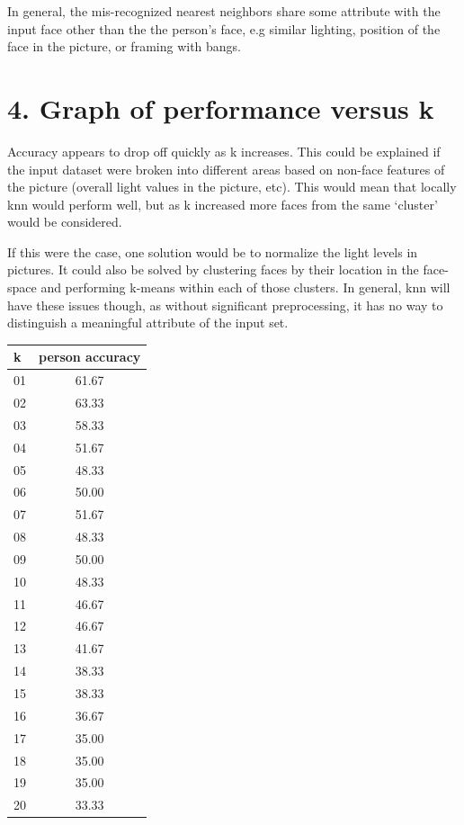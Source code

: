 \documentclass[]{article}
\begin{document}
In general, the mis-recognized nearest neighbors share some attribute
with the input face other than the the person's face, e.g similar
lighting, position of the face in the picture, or framing with bangs.

\section{4. Graph of performance versus
k}\label{graph-of-performance-versus-k}

Accuracy appears to drop off quickly as k increases. This could be
explained if the input dataset were broken into different areas based on
non-face features of the picture (overall light values in the picture,
etc). This would mean that locally knn would perform well, but as k
increased more faces from the same `cluster' would be considered.

\begin{center}
\end{center}

If this were the case, one solution would be to normalize the light
levels in pictures. It could also be solved by clustering faces by their
location in the face-space and performing k-means within each of those
clusters. In general, knn will have these issues though, as without
significant preprocessing, it has no way to distinguish a meaningful
attribute of the input set.

\begin{longtable}[c]{@{}lc@{}}
\toprule
k & person accuracy\tabularnewline
\midrule
\endhead
01 & 61.67\tabularnewline
02 & 63.33\tabularnewline
03 & 58.33\tabularnewline
04 & 51.67\tabularnewline
05 & 48.33\tabularnewline
06 & 50.00\tabularnewline
07 & 51.67\tabularnewline
08 & 48.33\tabularnewline
09 & 50.00\tabularnewline
10 & 48.33\tabularnewline
11 & 46.67\tabularnewline
12 & 46.67\tabularnewline
13 & 41.67\tabularnewline
14 & 38.33\tabularnewline
15 & 38.33\tabularnewline
16 & 36.67\tabularnewline
17 & 35.00\tabularnewline
18 & 35.00\tabularnewline
19 & 35.00\tabularnewline
20 & 33.33\tabularnewline
\bottomrule
\end{longtable}
\end{document}

